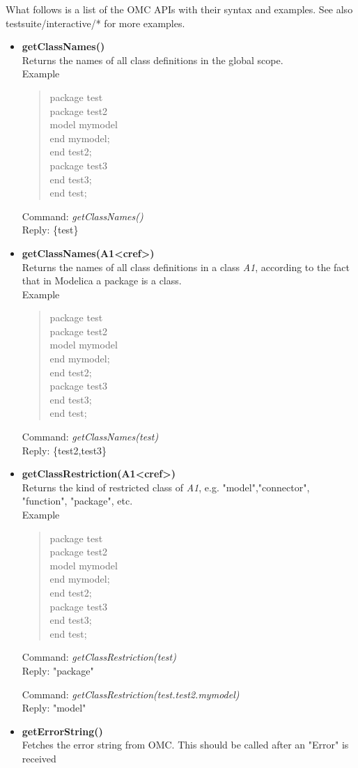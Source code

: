 \documentclass[11pt,a4paper,oneside,english]{book}
\newenvironment{modelicaExamples}{\begin{itemize}}{\end{itemize}}
\newcommand{\api}[2]{\item \textbf{#1} \\ #2}
\newcommand{\tab}{\hspace{2em}}
\newcommand{\command}[1]{Command: \textit{#1}\\}
\newcommand{\reply}[1]{Reply: #1}
\newcommand{\functionex}[2]{\begin{singlespace} \command{#1} \reply{#2} \end{singlespace}}
\newcommand{\examples}{Example}
\newenvironment{mocode}{\begin{verse}\begin{singlespace}\begin{scriptsize}\ttfamily}{\end{scriptsize}\end{singlespace}\end{verse}}
\begin{document}
What follows is a list of the OMC APIs with their syntax and examples. See also testsuite/interactive/* for more examples.

 	\begin{modelicaExamples}
		\api{getClassNames()}{Returns the names of all class definitions in the global scope.\\ \examples{}
			\begin{mocode}
				package test\\
			    \tab package test2\\
					\tab\tab model mymodel\\
					\tab\tab end mymodel;\\
				\tab end test2;\\
				\tab package test3\\
				\tab end test3;\\
				end test;\\
			\end{mocode}

			\functionex{getClassNames()}
			{\{test\}}

		}
		\api{getClassNames(A1<cref>)}{Returns the names of all class definitions in a class \textit{A1}, according to the fact that in Modelica a package is a class.\\ \examples
			\begin{mocode}
				package test\\
				\tab package test2\\
					\tab\tab model mymodel\\
					\tab\tab end mymodel;\\
				\tab end test2;\\
				\tab package test3\\
				\tab end test3;\\
				end test;\\
			\end{mocode}

			\functionex{getClassNames(test)}
			{\{test2,test3\}}

		}

		\api{getClassRestriction(A1<cref>)}{Returns the kind of restricted class of \textit{A1}, e.g. "model","connector", "function", "package", etc.\\ \examples
			\begin{mocode}
				package test\\
				\tab package test2\\
					\tab\tab model mymodel\\
					\tab\tab end mymodel;\\
				\tab end test2;\\
				\tab package test3\\
				\tab end test3;\\
				end test;\\
			\end{mocode}
			\functionex{getClassRestriction(test)}
			{"package"}
			\functionex{getClassRestriction(test.test2.mymodel)}
			{"model"}
		}
		\api{getErrorString()}{Fetches the error string from OMC. This should be called after an "Error" is received}


\end{modelicaExamples}
\end{document}
